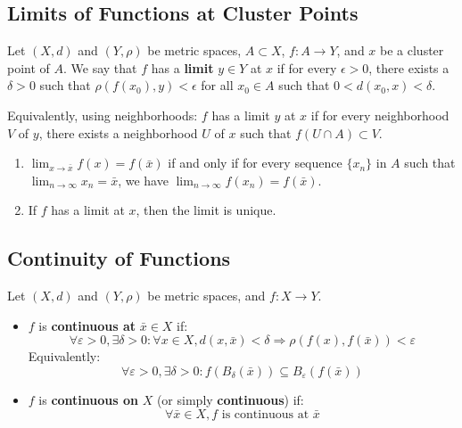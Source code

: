 \subsection{Limits of Functions at Cluster Points}
\begin{definition}
    Let $(X,d)$ and $(Y,\rho)$ be metric spaces, $A \subset X$, $f: A \rightarrow Y$, and $x$ be a cluster point of $A$. We say that $f$ has a \textbf{limit} $y \in Y$ at $x$ if for every $\epsilon > 0$, there exists a $\delta > 0$ such that $\rho(f(x_0),y) < \epsilon$ for all $x_0 \in A$ such that $0 < d(x_0,x) < \delta$.

    Equivalently, using neighborhoods: $f$ has a limit $y$ at $x$ if for every neighborhood $V$ of $y$, there exists a neighborhood $U$ of $x$ such that $f(U \cap A) \subset V$.
\end{definition}
\begin{property}
    \begin{enumerate}
        \item $\lim_{x\to \bar{x}} f(x) = f(\bar{x})$ if and only if for every sequence $\{x_n\}$ in $A$ such that $\lim_{n \to \infty} x_n = \bar{x}$, we have $\lim_{n \to \infty} f(x_n) = f(\bar{x})$.
        \item If $f$ has a limit at $x$, then the limit is unique.
    \end{enumerate}
\end{property}

\subsection{Continuity of Functions}
\begin{definition}
    Let $(X, d)$ and $(Y, \rho)$ be metric spaces, and $f : X \to Y$.
\begin{itemize}
    \item $f$ is \textbf{continuous at} $\bar{x} \in X$ if:
    $$
    \forall \varepsilon > 0, \exists \delta > 0 : \forall x \in X, d(x, \bar{x}) < \delta \Rightarrow \rho(f(x), f(\bar{x})) < \varepsilon
    $$
    Equivalently:
    $$
    \forall \varepsilon > 0, \exists \delta > 0 : f(B_\delta(\bar{x})) \subseteq B_\varepsilon(f(\bar{x}))
    $$
    \item $f$ is \textbf{continuous on} $X$ (or simply \textbf{continuous}) if:
    $$
    \forall \bar{x} \in X, f \text{ is continuous at } \bar{x}
    $$
\end{itemize}
\end{definition}

